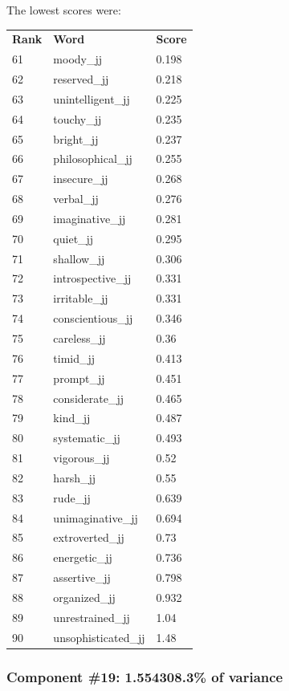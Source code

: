 \documentclass[10pt,letterpaper]{book}
\begin{document}
The lowest scores were:
\begin{tabular}{ l l l }
        \textbf{Rank} & \textbf{Word} & \textbf{Score} \\
        61 & moody\_jj & 0.198 \\
        62 & reserved\_jj & 0.218 \\
        63 & unintelligent\_jj & 0.225 \\
        64 & touchy\_jj & 0.235 \\
        65 & bright\_jj & 0.237 \\
        66 & philosophical\_jj & 0.255 \\
        67 & insecure\_jj & 0.268 \\
        68 & verbal\_jj & 0.276 \\
        69 & imaginative\_jj & 0.281 \\
        70 & quiet\_jj & 0.295 \\
        71 & shallow\_jj & 0.306 \\
        72 & introspective\_jj & 0.331 \\
        73 & irritable\_jj & 0.331 \\
        74 & conscientious\_jj & 0.346 \\
        75 & careless\_jj & 0.36 \\
        76 & timid\_jj & 0.413 \\
        77 & prompt\_jj & 0.451 \\
        78 & considerate\_jj & 0.465 \\
        79 & kind\_jj & 0.487 \\
        80 & systematic\_jj & 0.493 \\
        81 & vigorous\_jj & 0.52 \\
        82 & harsh\_jj & 0.55 \\
        83 & rude\_jj & 0.639 \\
        84 & unimaginative\_jj & 0.694 \\
        85 & extroverted\_jj & 0.73 \\
        86 & energetic\_jj & 0.736 \\
        87 & assertive\_jj & 0.798 \\
        88 & organized\_jj & 0.932 \\
        89 & unrestrained\_jj & 1.04 \\
        90 & unsophisticated\_jj & 1.48 \\
\end{tabular}
\subsubsection{Component \#19: 1.554308.3\% of variance}
\end{document}
